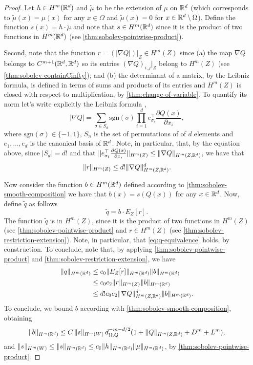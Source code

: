 \begin{proof}
Let $h \in H^m(\mathbb R^d)$ and $\tilde{\mu}$ to be the extension of $\mu$ on $\mathbb R^d$ (which corresponds to $\tilde{\mu}(x) = \mu(x)$ for any $x \in \Omega$ and $\tilde{\mu}(x) = 0$ for $x \in \mathbb R^d \setminus \Omega$). Define the function $s(x) = h \cdot \tilde{\mu}$ and note that $s \in H^m(\mathbb R^d)$ since it is the product of two functions in $H^m(\mathbb R^d)$ (see \cref{thm:sobolev-pointwise-product}).

Second, note that the function $r = (|\nabla Q|)|_Z \in H^m(Z)$ since (a) the map $\nabla Q$ belongs to $C^{m+1}(\mathbb R^d, \mathbb R^d)$ so its entries $(\nabla Q)_{i,j}|_Z$ belong to $H^m(Z)$ (see \cref{thm:sobolev-containCinfty}); and (b) the determinant of a matrix, by the Leibniz formula, is defined in terms of sums and products of its entries and $H^m(Z)$ is closed with respect to multiplication, by \cref{thm:change-of-variable}. To quantify its norm let's write explicitly the Leibniz formula \cite{trefethen1997numerical},
$$ |\nabla Q| = \sum_{\sigma \in S_d} \mathrm{sgn}(\sigma) \prod_{i=1}^d e_{\sigma_i}^\top\frac{\partial Q(x)}{\partial x_i},$$
where $\mathrm{sgn}(\sigma) \in \{-1,1\}$, $S_n$ is the set of permutations of of $d$ elements and $e_1,\dots,e_d$ is the canonical basis of $\mathbb R^d$. Note, in particular, that, by the equation above, since $|S_d| = d!$ and that $\|e_{\sigma_i}^\top\frac{\partial Q(x)}{\partial x_i}\|_{H^m(Z)} \leq \|\nabla Q\|_{H^m(Z,\mathbb R^d)}$, we have that
$$\|r\|_{H^m(Z)} \leq d! \|\nabla Q\|_{H^m(Z, \mathbb R^d)}^d.$$

Now consider the function $b \in H^m(\mathbb R^d)$ defined according to \cref{thm:sobolev-smooth-composition} we have that $b(x) = s(Q(x))$ for any $x \in \mathbb R^d$. Now, define $\tilde{q}$ as follows
$$ \tilde{q} = b  \cdot  E_Z[r].$$
The function $\tilde{q}$ is in $H^m(Z)$, since it is the product of two functions in $H^m(Z)$ (see \cref{thm:sobolev-pointwise-product} and $r \in H^m(Z)$ (see \cref{thm:sobolev-restriction-extension}). Note, in particular, that \cref{eq:q-equivalence} holds, by construction. To conclude, note that, by applying \cref{thm:sobolev-pointwise-product} and \cref{thm:sobolev-restriction-extension}, we have
\begin{align*}
\|q\|_{H^m(\mathbb R^d)} &\leq c_0 \|E_Z[r]\|_{H^m(\mathbb R^d)} \|b\|_{H^m(\mathbb R^d)} \\&\leq c_0 c_2 \|r\|_{H^m(Z)} \|b\|_{H^m(\mathbb R^d)} \\&\leq d! c_0 c_2 \|\nabla Q\|_{H^m(Z,\mathbb R^d)}^d \|b\|_{H^m(\mathbb R^d)}.
\end{align*}
To conclude, we bound $b$ according with \cref{thm:sobolev-smooth-composition}, obtaining
$$\|b\|_{H^m(\mathbb R^d)} \leq C\, \|s\|_{H^m(W)}\, d_{\Omega, Q}^{-m-d/2}(1 + \|Q\|_{H^m(Z, \mathbb R^d)} + D^m + L^m), $$
and $\|s\|_{H^m(W)} \leq \|s\|_{H^m(\mathbb R^d)} \leq c_0 \|h\|_{H^m(\mathbb R^d)}\|\mu\|_{H^m(\mathbb R^d)}$, by \cref{thm:sobolev-pointwise-product}.
\end{proof}

